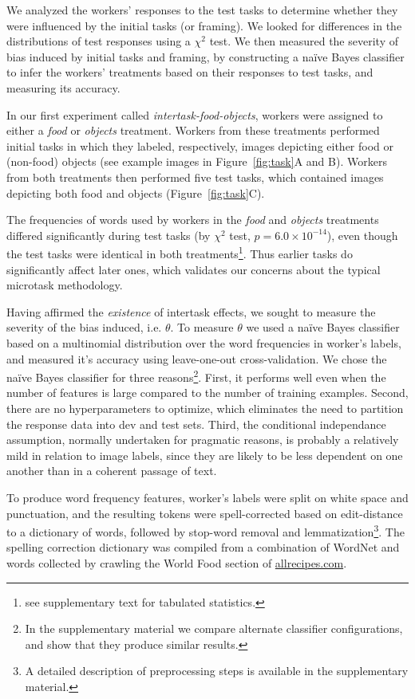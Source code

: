 \documentclass{sigchi}
\begin{document}
We analyzed the
workers' responses to the test tasks to determine whether
they were influenced by the initial tasks (or framing).  We looked for 
differences in the distributions of test responses 
using a $\chi^2$ test.  We then measured the 
severity of bias induced by initial tasks and framing, by 
constructing a na\"ive Bayes classifier to infer the workers' 
treatments based on their responses to test tasks, 
and measuring its accuracy.

In our first experiment called \textit{intertask-food-objects},
workers were assigned to either a \textit{food} or \textit{objects} 
treatment.  Workers from these treatments performed initial tasks 
in which they labeled, respectively, 
images depicting either food or (non-food) objects
(see example images in Figure~\ref{fig:task}A and B).  
Workers from both treatments then performed five test tasks, which
contained images
depicting both food and objects (Figure~\ref{fig:task}C).  

The frequencies of words used by
workers in the \textit{food} and \textit{objects} treatments differed
significantly during test tasks (by $\chi^2$ test, $p = 6.0 \times 10^{-14}$),
even though the test tasks were identical in both treatments\footnote{
	see supplementary text for tabulated statistics.
}.  Thus earlier tasks do significantly affect later ones, which 
validates our concerns about the typical microtask methodology.

Having affirmed the \textit{existence} of intertask effects, we sought to
measure the severity of the bias induced, i.e. $\theta$.
To measure $\theta$ we used a na\"ive Bayes classifier based on a 
multinomial distribution over the word frequencies in worker's labels, 
and measured it's accuracy using leave-one-out cross-validation.  
We chose the na\"ive Bayes
classifier for three reasons\footnote{In the supplementary material we 
  compare alternate classifier configurations, and show that they produce
similar results.}.  First, it performs well even when the 
number of features is large compared to the number of training examples.  
Second, there are no hyperparameters to 
optimize, which eliminates the need to partition the response data into
dev and test sets.
Third, the conditional independance assumption, normally 
undertaken for pragmatic reasons, is probably a relatively mild in 
relation to image labels, since they are likely to be less dependent
on one another than in a coherent passage of text.

To produce word frequency features, worker's labels were split on white
space and punctuation, and the resulting tokens were spell-corrected based
on edit-distance to a dictionary of words, followed by stop-word removal
and lemmatization\footnote{A detailed description of preprocessing steps 
is available in the supplementary material.}.  The spelling correction
dictionary was compiled from a combination of WordNet 
\cite{felbaum1998wordnet} and words
collected by crawling the World Food section of \url{allrecipes.com}.
\end{document}
